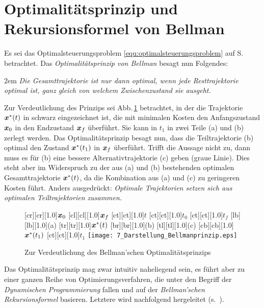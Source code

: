 \section{Optimalitätsprinzip und Rekursionsformel von Bellman} \label{sec:bellman}

Es sei das Optimalsteuerungsproblem \eqref{equ:optimalsteuerungsproblem} auf S.\,\pageref{equ:optimalsteuerungsproblem} betrachtet. Das \emph{Optimalitätsprinzip von Bellman} \cite{bellmann_DP} besagt nun Folgendes:

\vspace{.2cm}
\begingroup
\leftskip2em
\rightskip\leftskip
\emph{Die Gesamttrajektorie ist nur dann optimal, wenn jede Resttrajektorie optimal ist, ganz gleich von welchem Zwischenzustand sie ausgeht.}
\par
\endgroup
\vspace{.2cm}

Zur Verdeutlichung des Prinzips sei Abb.\,\ref{fig:Darstellung_Bellmanprinzip} betrachtet, in der die Trajektorie $\boldsymbol{x}^\ast(t)$ in schwarz eingezeichnet ist, die mit minimalen Kosten den Anfangszustand $\boldsymbol{x}_0$ in den Endzustand $\boldsymbol{x}_f$ überführt.
Sie kann in $t_1$ in zwei Teile (a) und (b) zerlegt werden. Das Optimalitätsprinzip besagt nun, dass die Teiltrajektorie (b) optimal den Zustand $\boldsymbol{x}^\ast(t_1)$ in $\boldsymbol{x}_f$ überführt. Trifft die Aussage nicht zu, dann muss es für (b) eine bessere Alternativtrajektorie (c) geben (graue Linie). Dies steht aber im Widerspruch zu der aus (a) und (b) bestehenden optimalen Gesamttrajektorie $\boldsymbol{x}^\ast(t)$, da die Kombination aus (a) und (c) zu geringeren Kosten führt. Anders ausgedrückt: \emph{Optimale Trajektorien setzen sich aus optimalen Teiltrajektorien zusammen.}
\begin{figure}[ht]
	[cr][cr][1.0]{$\boldsymbol{x}_0$}
	[cl][cl][1.0]{$\boldsymbol{x}_f$}
	[ct][ct][1.0]{$t$}
	[ct][ct][1.0]{$t_0$}
	[ct][ct][1.0]{$t_f$}
	[lb][lb][1.0]{(a)}
	[tr][tr][1.0]{$\boldsymbol{x}^\ast(t)$}
	[br][br][1.0]{(b)}
	[tl][tl][1.0]{(c)}
	[cb][cb][1.0]{$\boldsymbol{x}^\ast(t_1)$}
	[ct][ct][1.0]{$t_1$}
	\centering
 \texttt{[image: 7\_Darstellung\_Bellmanprinzip.eps]}
	\caption[Zur Verdeutlichung des Bellman'schen Optimalitätsprinzips]{Zur Verdeutlichung des Bellman'schen Optimalitätsprinzips \cite{foellingeroptimal}} 
	\label{fig:Darstellung_Bellmanprinzip}
\end{figure} 

Das Optimalitätsprinzip mag zwar intuitiv naheliegend sein, es führt aber zu einer ganzen Reihe von Optimierungsverfahren, die unter den Begriff der \emph{Dynamischen Programmierung} fallen und auf der \emph{Bellman'schen Rekursionsformel} basieren. Letztere wird nachfolgend hergeleitet (s.\ \zB \cite{foellingeroptimal, papageorgiou2012optimierung}).



